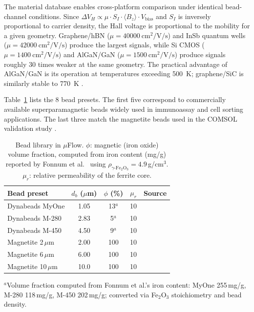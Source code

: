 \documentclass[preprint,review,12pt]{elsarticle}
\begin{document}
The material database enables cross-platform comparison under identical bead-channel conditions. Since $\Delta V_H \propto \mu \cdot S_I \cdot \langle B_z \rangle \cdot V_{\text{bias}}$ and $S_I$ is inversely proportional to carrier density, the Hall voltage is proportional to the mobility for a given geometry. Graphene/hBN ($\mu = \SI{40000}{\centi\meter\squared\per\volt\per\second}$) and InSb quantum wells ($\mu = \SI{42000}{\centi\meter\squared\per\volt\per\second}$) produce the largest signals, while Si CMOS ($\mu = \SI{1400}{\centi\meter\squared\per\volt\per\second}$) and AlGaN/GaN ($\mu = \SI{1500}{\centi\meter\squared\per\volt\per\second}$) produce signals roughly 30 times weaker at the same geometry. The practical advantage of AlGaN/GaN is its operation at temperatures exceeding \SI{500}{\kelvin}; graphene/SiC is similarly stable to \SI{770}{\kelvin} \cite{ciuk2019}.

Table~\ref{tab:beads} lists the 8 bead presets. The first five correspond to commercially available superparamagnetic beads widely used in immunoassay and cell sorting applications. The last three match the magnetite beads used in the COMSOL validation study \cite{govindaraju2025}.

\begin{table}[!htbp]
\caption{Bead library in $\mu$Flow. $\phi$: magnetic (iron oxide) volume fraction, computed from iron content (mg/g) reported by Fonnum et al.\ \cite{fonnum2005} using $\rho_{\gamma\text{-Fe}_2\text{O}_3} = 4.9$\,g/cm$^3$. $\mu_r$: relative permeability of the ferrite core.}
\label{tab:beads}
\centering
\footnotesize
\begin{tabular}{@{}lcccc@{}}
\toprule
Bead preset & $d_b$ ($\mu$m) & $\phi$ (\%) & $\mu_r$ & Source \\
\midrule
Dynabeads MyOne & 1.05 & 13$^a$ & 10 & \cite{fonnum2005} \\
Dynabeads M-280 & 2.83 & 5$^a$ & 10 & \cite{fonnum2005} \\
Dynabeads M-450 & 4.50 & 9$^a$ & 10 & \cite{fonnum2005} \\
Magnetite 2\,$\mu$m & 2.00 & 100 & 10 & \cite{govindaraju2025} \\
Magnetite 6\,$\mu$m & 6.00 & 100 & 10 & \cite{govindaraju2025} \\
Magnetite 10\,$\mu$m & 10.0 & 100 & 10 & \cite{govindaraju2025} \\
\bottomrule
\end{tabular}
\begin{flushleft}
\footnotesize{$^a$Volume fraction computed from Fonnum et al.'s iron content: MyOne 255\,mg/g, M-280 118\,mg/g, M-450 202\,mg/g; converted via Fe$_2$O$_3$ stoichiometry and bead density.}
\end{flushleft}
\end{table}
\end{document}
